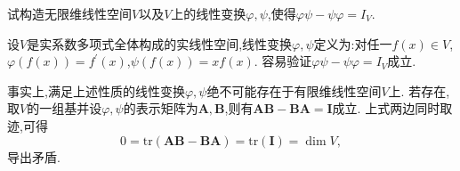 \documentclass[../../main.tex]{subfiles}%
\begin{document}
\begin{example}
试构造无限维线性空间\(V\)以及\(V\)上的线性变换\(\varphi,\psi\),使得\(\varphi\psi-\psi\varphi = I_V\).
\end{example}
\begin{solution}
设\(V\)是实系数多项式全体构成的实线性空间,线性变换\(\varphi,\psi\)定义为:对任一\(f(x)\in V\),\(\varphi(f(x)) = f^\prime(x)\),\(\psi(f(x)) = xf(x)\). 容易验证\(\varphi\psi-\psi\varphi = I_V\)成立.

\end{solution}
\begin{remark}
事实上,满足上述性质的线性变换\(\varphi,\psi\)绝不可能存在于有限维线性空间\(V\)上. 若存在,取\(V\)的一组基并设\(\varphi,\psi\)的表示矩阵为\(\boldsymbol{A},\boldsymbol{B}\),则有\(\boldsymbol{A}\boldsymbol{B}-\boldsymbol{B}\boldsymbol{A}=\boldsymbol{I}\)成立. 上式两边同时取迹,可得
\[
0=\text{tr}(\boldsymbol{A}\boldsymbol{B}-\boldsymbol{B}\boldsymbol{A})=\text{tr}(\boldsymbol{I})=\dim V,
\]
导出矛盾.
\end{remark}
\end{document}
